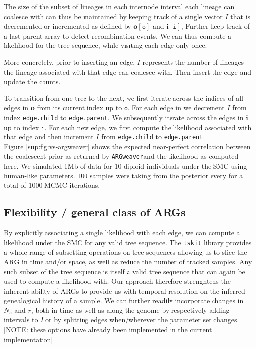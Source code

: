 \documentclass{article}
\newcommand{\argweaver}[0]{\texttt{ARGweaver}}
\begin{document}
The size of the subset of lineages in each internode interval each lineage 
can coalesce with can thus be maintained by keeping track of a single vector $I$ 
that is decremented or incremented as defined by
$\textbf{o}[\texttt{o}]$ and $\textbf{i}[\texttt{i}]$, 
Further keep track of a last-parent array to detect recombination events.
We can thus compute a likelihood for the tree sequence, while visiting each edge only once.

More concretely, prior to inserting an edge, $I$ represents the number of lineages 
the lineage associated with 
that edge can coalesce with. Then insert the edge and update the counts.

To transition from one tree to the next, we first iterate across the indices of all edges 
in $\textbf{o}$ from its current index up to $\texttt{o}$. For each edge in we decrement $I$ 
from index \texttt{edge.child} to \texttt{edge.parent}. We subsequently iterate across the 
edges in $\textbf{i}$ up to index $\texttt{i}$. For each new edge, we first compute the likelihood 
associated with that edge and then 
increment $I$ from \texttt{edge.child} to \texttt{edge.parent}.\\

Figure \ref{sup:fig:vs-argweaver} shows the expected near-perfect correlation 
between the coalescent prior as returned by \argweaver and the likelihood as computed here. 
We simulated 1Mb of data for 10 diploid individuals 
under the SMC using human-like parameters. 100 samples were taking from the posterior every for 
a total of 1000 MCMC iterations.
 

\subsection{Flexibility / general class of ARGs}

By explicitly associating a single likelihood with each edge, we can compute a likelihood 
under the SMC for any valid tree sequence. The \texttt{tskit} library provides a whole range  
of subsetting operations on tree sequences allowing us to slice the ARG in time and/or space, 
as well as reduce the number of tracked samples. 
Any such subset of the tree sequence is itself a valid tree sequence 
that can again be used to compute a likelihood with. Our approach therefore strenghtens 
the inherent ability of ARGs to provide us with temporal 
resolution on the inferred genealogical history of a sample. 
We can further readily incorporate changes in $N_e$ and $r$, 
both in time as well as along the genome by respectively adding intervals to $I$ 
or by splitting edges when/wherever the parameter set changes.
[NOTE: these options have already been implemented in the current implementation]
\end{document}
